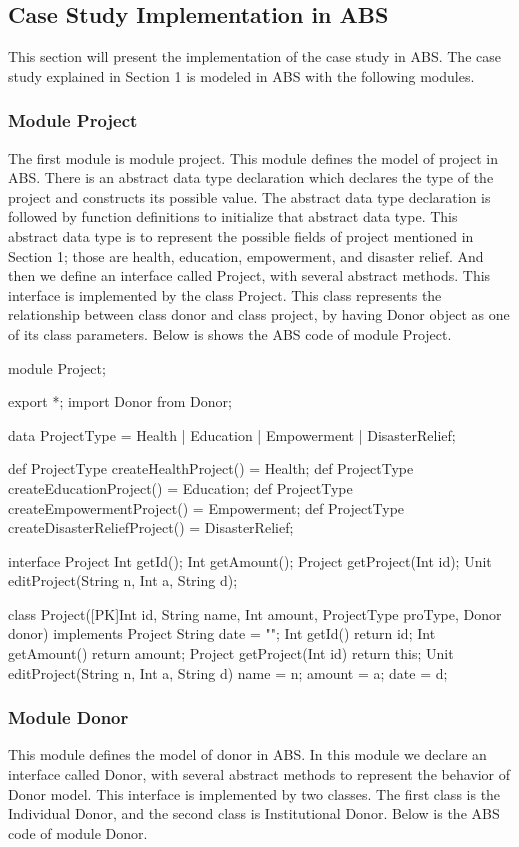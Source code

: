 \documentclass[runningheads,a4paper]{llncs}
\begin{document}
\subsection{Case Study Implementation in ABS}
This section will present the implementation of the case study in ABS.  The case study explained in Section 1 is modeled in ABS with the following modules.

\subsubsection{Module Project}
The first module is module project. This module defines the model of project in ABS. There is an abstract data type declaration which declares the type of the project and constructs its possible value. The abstract data type declaration is followed by function definitions to initialize that abstract data type. This abstract data type is to represent the possible fields of project mentioned in Section 1; those are health, education, empowerment, and disaster relief. And then we define an interface called Project, with several abstract methods. This interface is implemented by the class Project. This class represents the relationship between class donor and class project, by having Donor object as one of its class parameters. Below is shows the ABS code of module Project.

\begin{abscode}
module Project;
	
export *;
import Donor from Donor;

data ProjectType = Health | Education | Empowerment | DisasterRelief;
	
def ProjectType createHealthProject() = Health;
def ProjectType createEducationProject() = Education;
def ProjectType createEmpowermentProject() = Empowerment;
def ProjectType createDisasterReliefProject() = DisasterRelief; 

interface Project {
	Int getId();
	Int getAmount();
	Project getProject(Int id);
	Unit editProject(String n, Int a, String d);
}
	
class Project([PK]Int id, String name, Int amount, ProjectType proType, Donor donor) 
implements Project {
	String date = "";
	Int getId() { return id; }
	Int getAmount() { return amount; }
	Project getProject(Int id){ return this; }
	Unit editProject(String n, Int a, String d) {
		name = n;
		amount = a;
		date = d;
	}	
}
\end{abscode}

\subsubsection{Module Donor}
This module defines the model of donor in ABS. In this module we declare an interface called Donor, with several abstract methods to represent the behavior of Donor model. This interface is implemented by two classes. The first class is the Individual Donor, and the second class is Institutional Donor. Below is the ABS code of module Donor.
\end{document}
